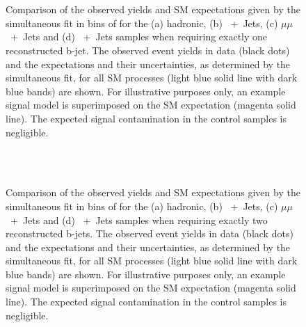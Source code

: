 \begin{figure}[h!]
  \begin{center}
     \\
     \\
    \caption{\label{fig:best-fit-1-btag} Comparison of the observed
      yields and SM expectations given by the simultaneous fit in bins
      of \HT for the (a) hadronic, (b) \Pmu~+~Jets, (c) $\mu\mu$~+~Jets and (d) \Pphoton~+~Jets
      samples when requiring exactly one reconstructed
      b-jet. The observed event yields in data (black dots) and the
      expectations and their uncertainties, as determined by the
      simultaneous fit, for all SM processes (light blue solid line
      with dark blue bands) are shown. For illustrative purposes only,
      an example signal model is superimposed on the SM expectation
      (magenta solid line). The expected signal contamination in the
      control samples is negligible.}
  \end{center}
\end{figure}


\begin{figure}[h!]
  \begin{center}
     \\
     \\
    \caption{\label{fig:best-fit-2-btag} Comparison of the observed
      yields and SM expectations given by the simultaneous fit in bins
      of \HT for the (a) hadronic, (b) \Pmu~+~Jets, (c) $\mu\mu$~+~Jets and (d) \Pphoton~+~Jets
      samples when requiring exactly two reconstructed
      b-jets. The observed event yields in data (black dots) and the
      expectations and their uncertainties, as determined by the
      simultaneous fit, for all SM processes (light blue solid line
      with dark blue bands) are shown. For illustrative purposes only,
      an example signal model is superimposed on the SM expectation
      (magenta solid line). The expected signal contamination in the
      control samples is negligible.}
  \end{center}
\end{figure}


